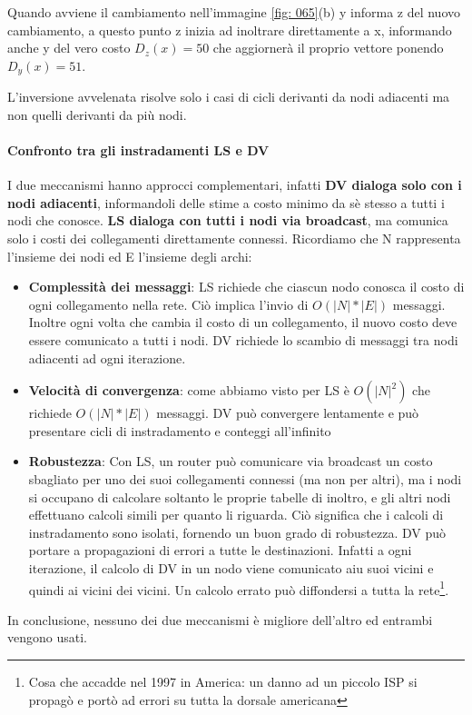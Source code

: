 \documentclass[11pt,a4paper]{article}
\begin{document}
Quando avviene il cambiamento nell'immagine \ref{fig: 065}(b) y informa z del nuovo cambiamento, a questo punto z inizia ad inoltrare direttamente a x, informando anche y del vero costo $D_{z}(x) = 50$ che aggiornerà il proprio vettore ponendo $D_{y}(x) = 51$. 

L'inversione avvelenata risolve solo i casi di cicli derivanti da nodi adiacenti ma non quelli derivanti da più nodi.

\paragraph{Confronto tra gli instradamenti LS e DV}
I due meccanismi hanno approcci complementari, infatti \textbf{DV dialoga solo con i nodi adiacenti}, informandoli delle stime a costo minimo da sè stesso a tutti i nodi che conosce. \textbf{LS dialoga con tutti i nodi via broadcast}, ma comunica solo i costi dei collegamenti direttamente connessi. 
Ricordiamo che N rappresenta l'insieme dei nodi ed E l'insieme degli archi:
\begin{itemize}
	\item \textbf{Complessità dei messaggi}: LS richiede che ciascun nodo conosca il costo di ogni collegamento nella rete. Ciò implica l'invio di $O(|N|*|E|)$ messaggi. Inoltre ogni volta che cambia il costo di un collegamento, il nuovo costo deve essere comunicato a tutti i nodi. DV richiede lo scambio di messaggi tra nodi adiacenti ad ogni iterazione.
	\item \textbf{Velocità di convergenza}: come abbiamo visto per LS è $O(|N|^{2})$ che richiede $O(|N|*|E|)$ messaggi. DV può convergere lentamente e può presentare cicli di instradamento e conteggi all'infinito
	\item \textbf{Robustezza}: Con LS, un router può comunicare via broadcast un costo sbagliato per uno dei suoi collegamenti connessi (ma non per altri), ma i nodi si occupano di calcolare soltanto le proprie tabelle di inoltro, e gli altri nodi effettuano calcoli simili per quanto li riguarda. Ciò significa che i calcoli di instradamento sono isolati, fornendo un buon grado di robustezza. DV può portare a propagazioni di errori a tutte le destinazioni. Infatti a ogni iterazione, il calcolo di DV in un nodo viene comunicato aiu suoi vicini e quindi ai vicini dei vicini. Un calcolo errato può diffondersi a tutta la rete\footnote{Cosa che accadde nel 1997 in America: un danno ad un piccolo ISP si propagò e portò ad errori su tutta la dorsale americana}.
\end{itemize}
In conclusione, nessuno dei due meccanismi è migliore dell'altro ed entrambi vengono usati.
\end{document}
